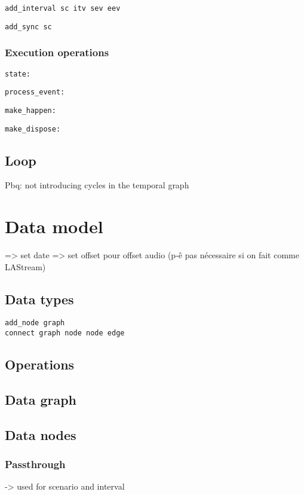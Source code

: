 \documentclass[applsci,article,submit,moreauthors,pdftex,10pt,a4paper]{mdpi}
\begin{document}
\begin{lstlisting}
add_interval sc itv sev eev
\end{lstlisting}
\begin{lstlisting}
add_sync sc
\end{lstlisting}
\subsubsection{Execution operations}

\begin{lstlisting}
state:
\end{lstlisting}

\begin{lstlisting}
process_event:
\end{lstlisting}
\begin{lstlisting}
make_happen:
\end{lstlisting}
\begin{lstlisting}
make_dispose:
\end{lstlisting}

\subsection{Loop}
Pbq: not introducing cycles in the temporal graph
\section{Data model}
=> set date
=> set offset pour offset audio (p-ê pas nécessaire si on fait comme LAStream)

\subsection{Data types}

\begin{lstlisting}
add_node graph 
connect graph node node edge
\end{lstlisting}
\subsection{Operations}
\subsection{Data graph}
\subsection{Data nodes}
\subsubsection{Passthrough}
-> used for scenario and interval
\end{document}
